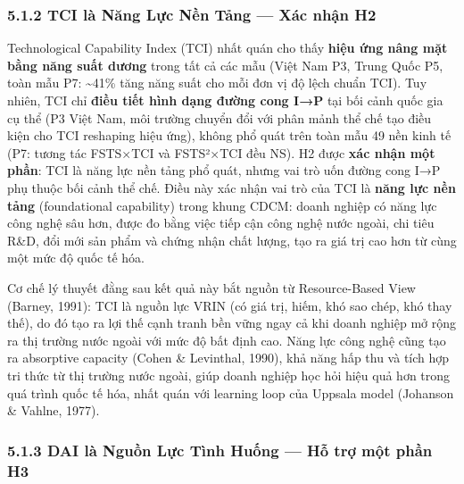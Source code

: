 \documentclass[12pt,a4paper]{article}
\begin{document}
\hypertarget{512-tci-luxe0-nux103ng-lux1ef1c-nux1ec1n-tux1ea3ng--xuxe1c-nhux1eadn-h2}{%
\subsubsection{5.1.2 TCI là Năng Lực Nền Tảng --- Xác nhận
H2}\label{512-tci-luxe0-nux103ng-lux1ef1c-nux1ec1n-tux1ea3ng--xuxe1c-nhux1eadn-h2}}

Technological Capability Index (TCI) nhất quán cho thấy \textbf{hiệu ứng
nâng mặt bằng năng suất dương} trong tất cả các mẫu (Việt Nam P3, Trung
Quốc P5, toàn mẫu P7: \textasciitilde41\% tăng năng suất cho mỗi đơn vị
độ lệch chuẩn TCI). Tuy nhiên, TCI chỉ \textbf{điều tiết hình dạng đường
cong I→P} tại bối cảnh quốc gia cụ thể (P3 Việt Nam, môi trường chuyển
đổi với phân mảnh thể chế tạo điều kiện cho TCI reshaping hiệu ứng),
không phổ quát trên toàn mẫu 49 nền kinh tế (P7: tương tác FSTS×TCI và
FSTS²×TCI đều NS). H2 được \textbf{xác nhận một phần}: TCI là năng lực
nền tảng phổ quát, nhưng vai trò uốn đường cong I→P phụ thuộc bối cảnh
thể chế. Điều này xác nhận vai trò của TCI là \textbf{năng lực nền tảng}
(foundational capability) trong khung CDCM: doanh nghiệp có năng lực
công nghệ sâu hơn, được đo bằng việc tiếp cận công nghệ nước ngoài, chi
tiêu R\&D, đổi mới sản phẩm và chứng nhận chất lượng, tạo ra giá trị cao
hơn từ cùng một mức độ quốc tế hóa.

Cơ chế lý thuyết đằng sau kết quả này bắt nguồn từ Resource-Based View
(Barney, 1991): TCI là nguồn lực VRIN (có giá trị, hiếm, khó sao chép,
khó thay thế), do đó tạo ra lợi thế cạnh tranh bền vững ngay cả khi
doanh nghiệp mở rộng ra thị trường nước ngoài với mức độ bất định cao.
Năng lực công nghệ cũng tạo ra absorptive capacity (Cohen \& Levinthal,
1990), khả năng hấp thu và tích hợp tri thức từ thị trường nước ngoài,
giúp doanh nghiệp học hỏi hiệu quả hơn trong quá trình quốc tế hóa, nhất
quán với learning loop của Uppsala model (Johanson \& Vahlne, 1977).

\hypertarget{513-dai-luxe0-nguux1ed3n-lux1ef1c-tuxecnh-huux1ed1ng--hux1ed7-trux1ee3-mux1ed9t-phux1ea7n-h3}{%
\subsubsection{5.1.3 DAI là Nguồn Lực Tình Huống --- Hỗ trợ một phần
H3}\label{513-dai-luxe0-nguux1ed3n-lux1ef1c-tuxecnh-huux1ed1ng--hux1ed7-trux1ee3-mux1ed9t-phux1ea7n-h3}}
\end{document}
